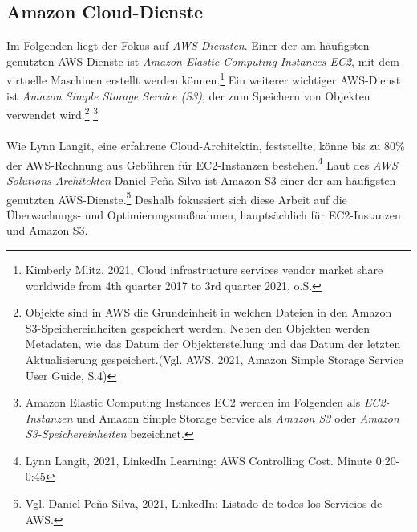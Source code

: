 \subsection{Amazon Cloud-Dienste}%
Im Folgenden liegt der Fokus auf \textit{AWS-Diensten}. Einer der am häufigsten genutzten AWS-Dienste ist \textit{Amazon Elastic Computing Instances EC2}, mit dem virtuelle Maschinen erstellt werden können.\footnote{Kimberly Mlitz, 2021, Cloud infrastructure services vendor market share worldwide from 4th quarter 2017 to 3rd quarter 2021, o.S.\cite{STA4}} Ein weiterer wichtiger AWS-Dienst ist \textit{Amazon Simple Storage Service (S3)}, der zum Speichern von Objekten verwendet wird.\footnote{Objekte sind in AWS die Grundeinheit in welchen Dateien in den Amazon S3-Speichereinheiten gespeichert werden. Neben den Objekten werden Metadaten, wie das Datum der Objekterstellung und das Datum der letzten Aktualisierung gespeichert.(Vgl. AWS, 2021, Amazon Simple Storage Service User Guide, S.4\cite{AMZ18})}{ }\footnote{Amazon Elastic Computing Instances EC2 werden im Folgenden als \textit{EC2-Instanzen} und Amazon Simple Storage Service als \textit{Amazon S3} oder \textit{Amazon S3-Speichereinheiten} bezeichnet.}
\\\\
Wie Lynn Langit, eine erfahrene Cloud-Architektin, feststellte, könne bis zu 80\% der AWS-Rechnung aus Gebühren für EC2-Instanzen bestehen.\footnote{Lynn Langit, 2021, LinkedIn Learning: AWS Controlling Cost. Minute 0:20-0:45\cite{LINK2}} Laut des \textit{AWS Solutions Architekten} Daniel Peña Silva ist Amazon S3 einer der am häufigsten genutzten AWS-Dienste.\footnote{Vgl. Daniel Peña Silva, 2021, LinkedIn: Listado de todos los Servicios de AWS.\cite{LINK1}} Deshalb fokussiert sich diese Arbeit auf die Überwachungs- und Optimierungsmaßnahmen, hauptsächlich für EC2-Instanzen und Amazon S3.  %
